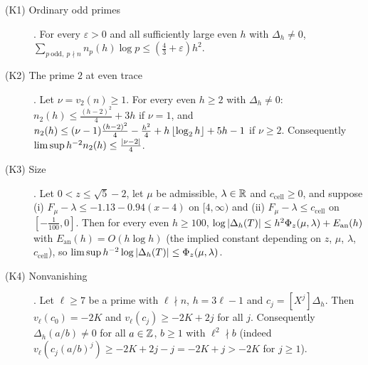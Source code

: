 \begin{description}
\item[(K1) Ordinary odd primes] \cite[Theorem~3.7]{Krisman2026units}. For every $\varepsilon>0$ and all
sufficiently large even $h$ with $\Delta_h\ne0$,
$\sum_{p\ \mathrm{odd},\ p\nmid n}n_p(h)\log p\le(\frac43+\varepsilon)h^2$.
\item[(K2) The prime $2$ at even trace] \cite[Proposition~4.2]{Krisman2026units}. Let $\nu=v_2(n)\ge1$. For
every even $h\ge2$ with $\Delta_h\ne0$: $n_2(h)\le\frac{(h-2)^2}4+3h$ if $\nu=1$, and
$n_2(h)\le(\nu-1)\frac{(h-2)^2}4-\frac{h^2}4+h\left\lfloor \log_2h\right\rfloor+5h-1$ if $\nu\ge2$. Consequently
$\limsup h^{-2}n_2(h)\le\frac{\left\lvert \nu-2\right\rvert}4$.
\item[(K3) Size] \cite[Theorem~5.1]{Krisman2026units}. Let $0<z\le\sqrt5-2$, let $\mu$ be admissible,
$\lambda\in\mathbb{R}$ and $c_{\mathrm{cell}}\ge0$, and suppose
\textup{(i)} $F_\mu-\lambda\le-1.13-0.94(x-4)$ on $[4,\infty)$ and
\textup{(ii)} $F_\mu-\lambda\le c_{\mathrm{cell}}$ on $[-\tfrac1{100},0]$. Then for every even $h\ge100$,
$\log\left\lvert \Delta_h(T)\right\rvert\le h^2\Phi_z(\mu,\lambda)+E_{\mathrm{an}}(h)$ with $E_{\mathrm{an}}(h)=O(h\log h)$ (the implied constant depending on $z$, $\mu$, $\lambda$, $c_{\mathrm{cell}}$),
so $\limsup h^{-2}\log\left\lvert \Delta_h(T)\right\rvert\le\Phi_z(\mu,\lambda)$.
\item[(K4) Nonvanishing] \cite[Lemma~6.1]{Krisman2026units}. Let $\ell\ge7$ be a prime with $\ell\nmid n$,
$h=3\ell-1$ and $c_j=[X^j]\Delta_h$. Then $v_\ell(c_0)=-2K$ and $v_\ell(c_j)\ge-2K+2j$ for all $j$.
Consequently $\Delta_h(a/b)\ne0$ for all $a\in\mathbb{Z}$, $b\ge1$ with $\ell^2\nmid b$ (indeed $v_\ell(c_j(a/b)^j)\ge-2K+2j-j=-2K+j>-2K$ for $j\ge1$).
\end{description}

